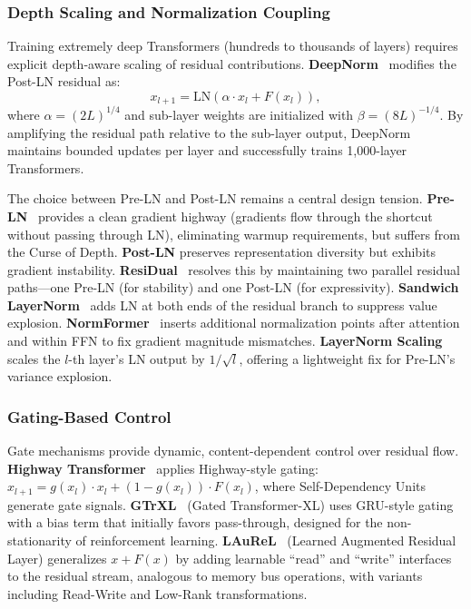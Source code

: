\subsubsection{Depth Scaling and Normalization Coupling}

Training extremely deep Transformers (hundreds to thousands of layers) requires explicit depth-aware scaling of residual contributions. \textbf{DeepNorm}~\cite{wang2024deepnet} modifies the Post-LN residual as:
\begin{equation}
  x_{l+1} = \mathrm{LN}(\alpha \cdot x_l + F(x_l)),
  \label{eq:deepnorm}
\end{equation}
where $\alpha = (2L)^{1/4}$ and sub-layer weights are initialized with $\beta = (8L)^{-1/4}$. By amplifying the residual path relative to the sub-layer output, DeepNorm maintains bounded updates per layer and successfully trains 1,000-layer Transformers.

The choice between Pre-LN and Post-LN remains a central design tension. \textbf{Pre-LN}~\cite{xiong2020layer} provides a clean gradient highway (gradients flow through the shortcut without passing through LN), eliminating warmup requirements, but suffers from the Curse of Depth. \textbf{Post-LN} preserves representation diversity but exhibits gradient instability. \textbf{ResiDual}~\cite{xie2023residual} resolves this by maintaining two parallel residual paths---one Pre-LN (for stability) and one Post-LN (for expressivity). \textbf{Sandwich LayerNorm}~\cite{ding2021cogview} adds LN at both ends of the residual branch to suppress value explosion. \textbf{NormFormer}~\cite{shleifer2022normformer} inserts additional normalization points after attention and within FFN to fix gradient magnitude mismatches. \textbf{LayerNorm Scaling}~\cite{sun2025curse} scales the $l$-th layer's LN output by $1/\sqrt{l}$, offering a lightweight fix for Pre-LN's variance explosion.

\subsubsection{Gating-Based Control}

Gate mechanisms provide dynamic, content-dependent control over residual flow. \textbf{Highway Transformer}~\cite{chai2020highway} applies Highway-style gating: $x_{l+1} = g(x_l) \cdot x_l + (1-g(x_l)) \cdot F(x_l)$, where Self-Dependency Units generate gate signals. \textbf{GTrXL}~\cite{parisotto2020stabilizing} (Gated Transformer-XL) uses GRU-style gating with a bias term that initially favors pass-through, designed for the non-stationarity of reinforcement learning. \textbf{LAuReL}~\cite{menghani2024laurel} (Learned Augmented Residual Layer) generalizes $x + F(x)$ by adding learnable ``read'' and ``write'' interfaces to the residual stream, analogous to memory bus operations, with variants including Read-Write and Low-Rank transformations.

